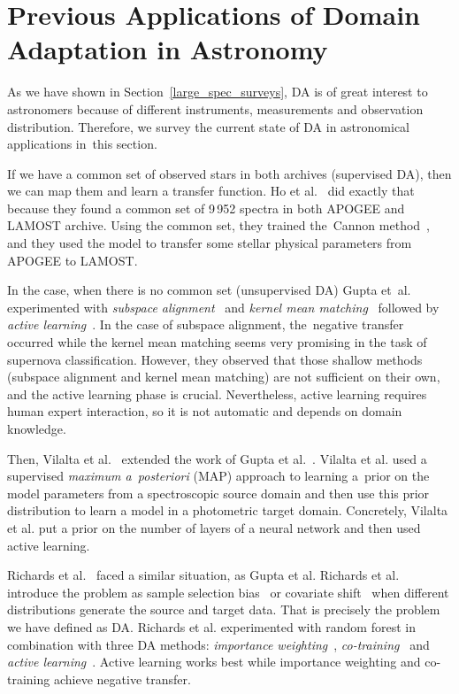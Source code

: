 \section{Previous Applications of Domain Adaptation in Astronomy}
\label{da_astronomy}

As we have shown in Section~\ref{large_spec_surveys},
DA is of great interest to astronomers
because of different instruments, measurements and observation distribution.
Therefore, we survey the current state of DA in astronomical applications in~this section.

If we have a common set of observed stars in both archives (supervised DA),
then we can map them and learn a transfer function.
Ho et al.~\cite{ho2017} did exactly that
because they found a common set of 9\,952 spectra in both APOGEE and LAMOST archive.
Using the common set, they trained the~Cannon method~\cite{ness2015},
and they used the model to transfer some stellar physical parameters from APOGEE to LAMOST.

In the case, when there is no common set (unsupervised DA)
Gupta et~al.~\cite{gupta2016} experimented
with \textit{subspace alignment}~\cite{fernando2014}
and \textit{kernel mean matching}~\cite{gretton2009}
followed by \textit{active learning}~\cite{settles2009}.
In the case of subspace alignment,
the~negative transfer occurred
while the kernel mean matching seems very promising in the task of supernova classification.
However, they observed that those shallow methods
(subspace alignment and kernel mean matching) are not sufficient on their own,
and the active learning phase is crucial.
Nevertheless, active learning requires human expert interaction,
so it is not automatic and depends on domain knowledge.

Then, Vilalta et al.~\cite{vilalta2018} extended the work of Gupta et al.~\cite{gupta2016}.
Vilalta et al. used a supervised \textit{maximum a~posteriori} (MAP) approach
to learning a~prior on the model parameters from a spectroscopic source domain
and then use this prior distribution to learn a model in a photometric target domain.
Concretely, Vilalta et al. put a prior on the number of layers of a neural network
and then used active learning.

Richards et al.~\cite{richards2011} faced a similar situation, as Gupta et al.
Richards et al. introduce the problem as sample selection bias~\cite{shimodaira2000} or covariate shift~\cite{heckman1979}
when different distributions generate the source and target data.
That is precisely the problem we have defined as DA.
Richards et al. experimented with random forest in combination with three DA methods:
\textit{importance weighting}~\cite{shimodaira2000},
\textit{co-training}~\cite{blum1998}
and \textit{active learning}~\cite{settles2009}.
Active learning works best while importance weighting and co-training achieve negative transfer.

